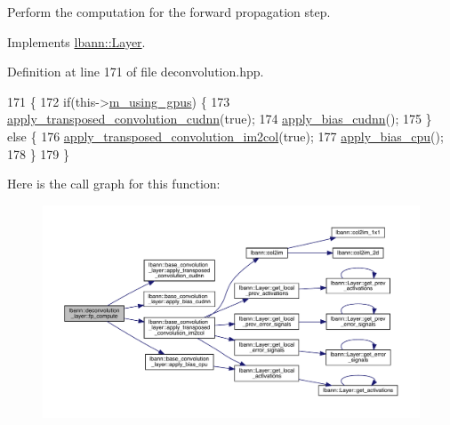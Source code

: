 Perform the computation for the forward propagation step. 

Implements \hyperlink{classlbann_1_1Layer_a523319dd1bd87a0612afa1912bb5aad7}{lbann\+::\+Layer}.



Definition at line 171 of file deconvolution.\+hpp.


\begin{DoxyCode}
171                              \{
172     \textcolor{keywordflow}{if}(this->\hyperlink{classlbann_1_1Layer_af7881cb5eff5207c15fa835d65462e8f}{m\_using\_gpus}) \{
173       \hyperlink{classlbann_1_1base__convolution__layer_a130907ca7a8e3b6676bdd4186c788ef4}{apply\_transposed\_convolution\_cudnn}(\textcolor{keyword}{true});
174       \hyperlink{classlbann_1_1base__convolution__layer_aa33e490222597c4c5203d94061ae9d88}{apply\_bias\_cudnn}();
175     \} \textcolor{keywordflow}{else} \{
176       \hyperlink{classlbann_1_1base__convolution__layer_a87fb2bf066a98052938e48a82dcd4fd2}{apply\_transposed\_convolution\_im2col}(\textcolor{keyword}{true});
177       \hyperlink{classlbann_1_1base__convolution__layer_a4f792e1c19d4591f305880b57f63cec3}{apply\_bias\_cpu}();
178     \}
179   \}
\end{DoxyCode}
Here is the call graph for this function\+:\nopagebreak
\begin{figure}[H]
\begin{center}
\leavevmode
\includegraphics[width=350pt]{classlbann_1_1deconvolution__layer_a6ebbb96c605a96b41fdbbc848dcaa877_cgraph}
\end{center}
\end{figure}
\mbox{\label{classlbann_1_1deconvolution__layer_a43249c72b440db8b5a1a7f2735c6a118}} 
